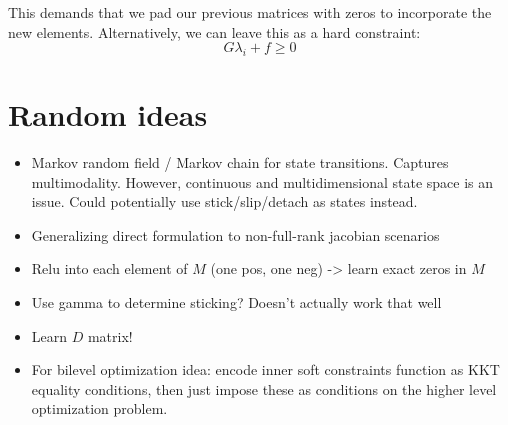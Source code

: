\documentclass{article}
\begin{document}
This demands that we pad our previous matrices with zeros to incorporate the new elements. Alternatively, we can leave this as a hard constraint:
\[
    G \lambda_i + f \geq 0
\]

\section{Random ideas}
\begin{itemize}
    \item Markov random field / Markov chain for state transitions. Captures multimodality. However, continuous and multidimensional state space is an issue. Could potentially use stick/slip/detach as states instead.
    \item Generalizing direct formulation to non-full-rank jacobian scenarios
    \item Relu into each element of $M$ (one pos, one neg) -> learn exact zeros in $M$
    \item Use gamma to determine sticking? Doesn't actually work that well
    \item Learn $D$ matrix!
    \item For bilevel optimization idea: encode inner soft constraints function as KKT equality conditions, then just impose these as conditions on the higher level optimization problem.
\end{itemize}
\end{document}
